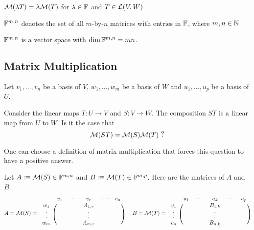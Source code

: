 \setcounter{thm}{37}
\begin{thm}
  $\mathcal{M}(\lambda T) = \lambda \mathcal{M}(T)$ for $\lambda \in \mathbb{F}$ and $T \in \mathcal{L} (V,W)$
\end{thm}

\begin{mydef} 
  $\mathbb{F}^{m,n}$ denotes the set of all $m$-by-$n$ matrices with entries in $\mathbb{F}$, where $m,n \in \mathbb{N}$
\end{mydef}

\begin{thm} %
  \label{thm: the dimension of the vector space of all m by n matrices is mn}
  $\mathbb{F}^{m,n}$ is a vector space with $\dim \mathbb{F}^{m,n}=mn$.
\end{thm}


\subsection{Matrix Multiplication}

Let $v_1, \ldots, v_n$ be a basis of $V$, $w_1, \ldots, w_m$ be a basis of $W$ and $u_1, \ldots, u_p$ be a basis of $U$.

Consider the linear maps $T: U \to V$ and $S: V \to W$. The composition $ST$ is a linear map from $U$ to $W$. Is it the case that
\begin{equation}
  \mmatrix(ST) = \mmatrix(S) \mmatrix(T) \; {\mathlarger ?}
\end{equation}

One can choose a definition of matrix multiplication that forces this question to have a positive answer. 

Let $A :\equiv \mathcal{M}(S)\in \mathbb{F}^{m,n}$ and $B :\equiv \mathcal{M}(T)\in \mathbb{F}^{m,p}$. Here are the matrices of $A$ and $B$.
\begin{equation}
  A=\mathcal{M} (S) =
  \begin{blockarray}{cccccc}
    & v_1 & \cdots & v_r     & \cdots & v_n \\
    \begin{block}{c(ccccc)}
      w_1    &     &        & A_{1,r} &        &     \\
      \vdots &     &        & \vdots  &        &     \\
      w_m    &     &        & A_{m,r} &        &     \\
    \end{block}
  \end{blockarray},
  \quad
  B=\mathcal{M} (T) =
  \begin{blockarray}{cccccc}
    & u_1 & \cdots & u_k     & \cdots & u_p \\
    \begin{block}{c(ccccc)}
      v_1    &     &        & B_{1,k} &        &     \\
      \vdots &     &        & \vdots  &        &     \\
      v_n    &     &        & B_{n,k} &        &     \\
    \end{block}
  \end{blockarray}
\end{equation}

